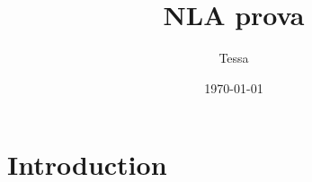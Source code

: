 \documentclass[12pt]{article}
\title{NLA prova}
\author{Tessa}
\date{\today}
\begin{document}
\maketitle

\tableofcontents

\section{Introduction}

\end{document}
